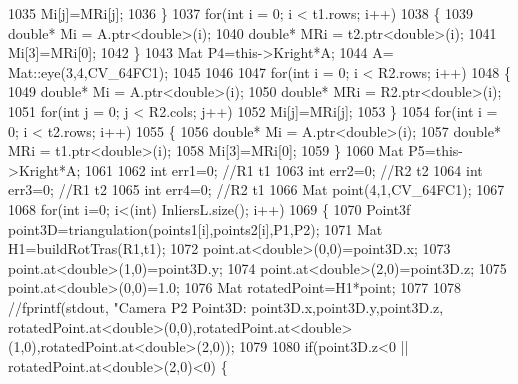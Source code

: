 \begin{DoxyCode}
1035                      Mi[j]=MRi[j];
1036          \}
1037         \textcolor{keywordflow}{for}(\textcolor{keywordtype}{int} i = 0; i < t1.rows; i++)
1038          \{
1039              \textcolor{keywordtype}{double}* Mi = A.ptr<\textcolor{keywordtype}{double}>(i);
1040              \textcolor{keywordtype}{double}* MRi = t2.ptr<\textcolor{keywordtype}{double}>(i);
1041              Mi[3]=MRi[0];
1042          \}
1043         Mat P4=this->Kright*A;
1044         A= Mat::eye(3,4,CV\_64FC1);
1045 
1046 
1047             \textcolor{keywordflow}{for}(\textcolor{keywordtype}{int} i = 0; i < R2.rows; i++)
1048      \{
1049          \textcolor{keywordtype}{double}* Mi = A.ptr<\textcolor{keywordtype}{double}>(i);
1050          \textcolor{keywordtype}{double}* MRi = R2.ptr<\textcolor{keywordtype}{double}>(i);
1051             \textcolor{keywordflow}{for}(\textcolor{keywordtype}{int} j = 0; j < R2.cols; j++)
1052                  Mi[j]=MRi[j];
1053      \}
1054     \textcolor{keywordflow}{for}(\textcolor{keywordtype}{int} i = 0; i < t2.rows; i++)
1055      \{
1056          \textcolor{keywordtype}{double}* Mi = A.ptr<\textcolor{keywordtype}{double}>(i);
1057          \textcolor{keywordtype}{double}* MRi = t1.ptr<\textcolor{keywordtype}{double}>(i);
1058          Mi[3]=MRi[0];
1059      \}
1060      Mat P5=this->Kright*A;
1061 
1062      \textcolor{keywordtype}{int} err1=0; \textcolor{comment}{//R1 t1}
1063      \textcolor{keywordtype}{int} err2=0; \textcolor{comment}{//R2 t2}
1064      \textcolor{keywordtype}{int} err3=0; \textcolor{comment}{//R1 t2}
1065      \textcolor{keywordtype}{int} err4=0; \textcolor{comment}{//R2 t1}
1066      Mat point(4,1,CV\_64FC1);
1067 
1068          \textcolor{keywordflow}{for}(\textcolor{keywordtype}{int} i=0; i<(int) InliersL.size(); i++) 
1069          \{
1070              Point3f point3D=triangulation(points1[i],points2[i],P1,P2);
1071              Mat H1=buildRotTras(R1,t1);
1072              point.at<\textcolor{keywordtype}{double}>(0,0)=point3D.x;
1073              point.at<\textcolor{keywordtype}{double}>(1,0)=point3D.y;
1074              point.at<\textcolor{keywordtype}{double}>(2,0)=point3D.z;
1075              point.at<\textcolor{keywordtype}{double}>(0,0)=1.0;
1076              Mat rotatedPoint=H1*point;
1077 
1078              \textcolor{comment}{//fprintf(stdout, "Camera P2 Point3D: %
       point3D.x,point3D.y,point3D.z, rotatedPoint.at<double>(0,0),rotatedPoint.at<double>(1,0),rotatedPoint.at<double>(2,0));}
1079 
1080              \textcolor{keywordflow}{if}(point3D.z<0 || rotatedPoint.at<\textcolor{keywordtype}{double}>(2,0)<0) \{

\end{DoxyCode}
